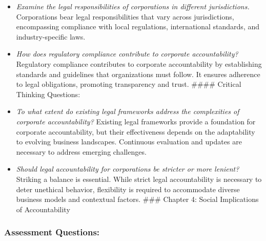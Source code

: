 \documentclass[
  letterpaper,
  DIV=11,
  numbers=noendperiod]{scrreprt}
\begin{document}
\begin{itemize}
\item
  \emph{Examine the legal responsibilities of corporations in different
  jurisdictions.} Corporations bear legal responsibilities that vary
  across jurisdictions, encompassing compliance with local regulations,
  international standards, and industry-specific laws.
\item
  \emph{How does regulatory compliance contribute to corporate
  accountability?} Regulatory compliance contributes to corporate
  accountability by establishing standards and guidelines that
  organizations must follow. It ensures adherence to legal obligations,
  promoting transparency and trust. \#\#\#\# Critical Thinking
  Questions:
\item
  \emph{To what extent do existing legal frameworks address the
  complexities of corporate accountability?} Existing legal frameworks
  provide a foundation for corporate accountability, but their
  effectiveness depends on the adaptability to evolving business
  landscapes. Continuous evaluation and updates are necessary to address
  emerging challenges.
\item
  \emph{Should legal accountability for corporations be stricter or more
  lenient?} Striking a balance is essential. While strict legal
  accountability is necessary to deter unethical behavior, flexibility
  is required to accommodate diverse business models and contextual
  factors. \#\#\# Chapter 4: Social Implications of Accountability
\end{itemize}

\subsubsection{Assessment Questions:}\label{assessment-questions-9}
\end{document}
